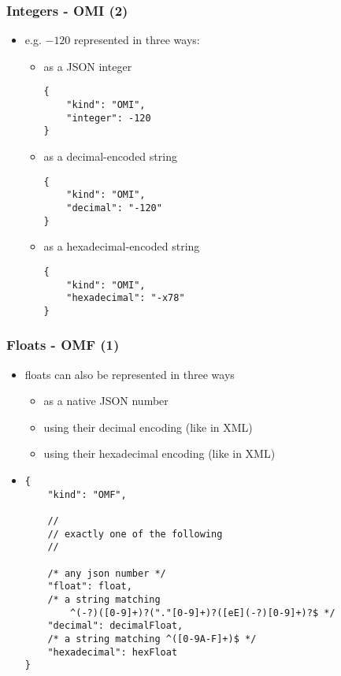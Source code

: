 \documentclass[usenames,dvipsnames]{beamer}
\begin{document}
\begin{frame}[fragile]
    \frametitle{Integers - OMI (2)}
    \begin{itemize}
    \item e.g. $-120$ represented in three ways:
    \begin{itemize}
        \item as a JSON integer
\begin{lstlisting}
{
    "kind": "OMI",
    "integer": -120
}
\end{lstlisting}
        \item as a decimal-encoded string
\begin{lstlisting}
{
    "kind": "OMI",
    "decimal": "-120"
}
\end{lstlisting}
        \item as a hexadecimal-encoded string
\begin{lstlisting}
{
    "kind": "OMI",
    "hexadecimal": "-x78"
}
\end{lstlisting}
        \end{itemize}
    \end{itemize}
\end{frame}

\begin{frame}[fragile]
    \frametitle{Floats - OMF (1)}
    \begin{itemize}
        \item floats can also be represented in three ways
        \begin{itemize}
            \item as a native JSON number
            \item using their decimal encoding (like in XML)
            \item using their hexadecimal encoding (like in XML)
        \end{itemize}
        \item
\begin{lstlisting}
{
    "kind": "OMF",

    //
    // exactly one of the following
    //

    /* any json number */
    "float": float,
    /* a string matching 
        ^(-?)([0-9]+)?("."[0-9]+)?([eE](-?)[0-9]+)?$ */
    "decimal": decimalFloat,
    /* a string matching ^([0-9A-F]+)$ */
    "hexadecimal": hexFloat 
}
\end{lstlisting}
    \end{itemize}
\end{frame}
\end{document}
